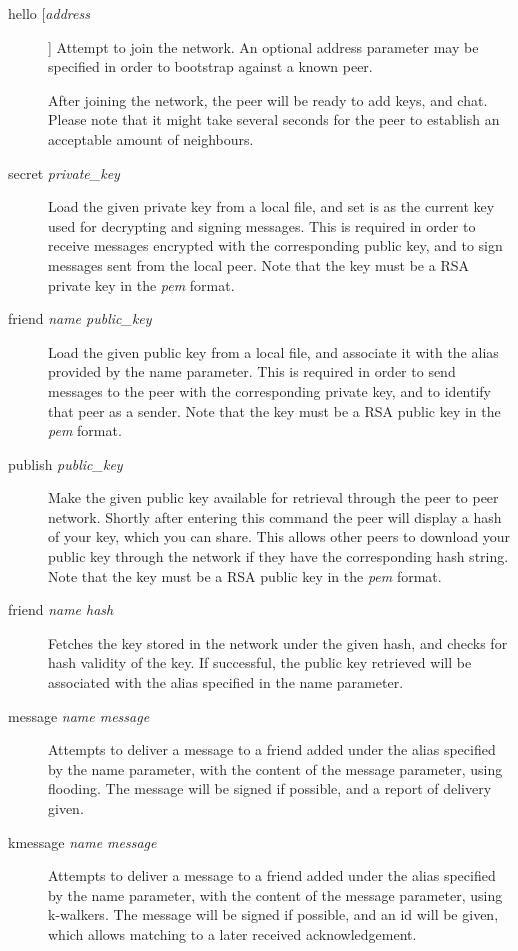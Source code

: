 \begin{description}
\item[hello [\textit{address}]] Attempt to join the network. An optional address parameter may be specified in order to bootstrap against a known peer.

After joining the network, the peer will be ready to add keys, and chat. Please note that it might take several seconds for the peer to establish an acceptable amount of neighbours.

\item[secret \textit{private\_key}]
Load the given private key from a local file, and set is as the current key used for decrypting and signing messages. 
This is required in order to receive messages encrypted with the corresponding public key, and to sign messages sent from the local peer.
Note that the key must be a RSA private key in the \textit{pem} format.

\item[friend \textit{name public\_key}]
Load the given public key from a local file, and associate it with the alias provided by the name parameter. 
This is required in order to send messages to the peer with the corresponding private key, and to identify that peer as a sender.
Note that the key must be a RSA public key in the \textit{pem} format.

\item[publish \textit{public\_key}]
Make the given public key available for retrieval through the peer to peer network. Shortly after entering this command the peer will display a hash of your key, which you can share. This allows other peers to download your public key through the network if they have the corresponding hash string.
Note that the key must be a RSA public key in the \textit{pem} format.

\item[friend \textit{name hash}]
Fetches the key stored in the network under the given hash, and checks for hash validity of the key. If successful, the public key retrieved will be associated with the alias specified in the name parameter.

\item[message \textit{name message}]
Attempts to deliver a message to a friend added under the alias specified by the name parameter, with the content of the message parameter, using flooding.
The message will be signed if possible, and a report of delivery given.

\item[kmessage \textit{name message}]
Attempts to deliver a message to a friend added under the alias specified by the name parameter, with the content of the message parameter, using k-walkers.
The message will be signed if possible, and an id will be given, which allows matching to a later received acknowledgement.

\end{description}
